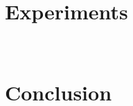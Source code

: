 \documentclass{llncs}
\begin{document}
\section{Experiments}~\label{sec:exp}


\section{Conclusion}~\label{sec:conclusion}


\newpage
%



\appendix

\end{document}
